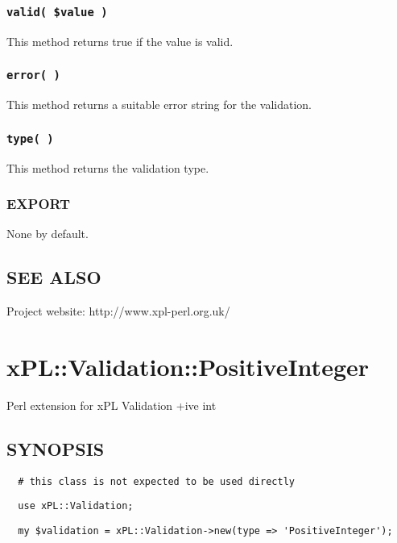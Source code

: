 \subsubsection*{\texttt{valid( \$value )}\label{xPL::Validation_valid_value_}}


This method returns true if the value is valid.

\subsubsection*{\texttt{error( )}\label{xPL::Validation_error_}}


This method returns a suitable error string for the validation.

\subsubsection*{\texttt{type( )}\label{xPL::Validation_type_}}


This method returns the validation type.

\subsubsection*{EXPORT\label{xPL::Validation_EXPORT}}


None by default.

\subsection*{SEE ALSO\label{xPL::Validation_SEE_ALSO}}


Project website: http://www.xpl-perl.org.uk/

\section{xPL::Validation::PositiveInteger\label{xPL::Validation::PositiveInteger}}


Perl extension for xPL Validation +ive int

\subsection*{SYNOPSIS\label{xPL::Validation::PositiveInteger_SYNOPSIS}}
\begin{verbatim}
  # this class is not expected to be used directly
\end{verbatim}
\begin{verbatim}
  use xPL::Validation;
\end{verbatim}
\begin{verbatim}
  my $validation = xPL::Validation->new(type => 'PositiveInteger');
\end{verbatim}
